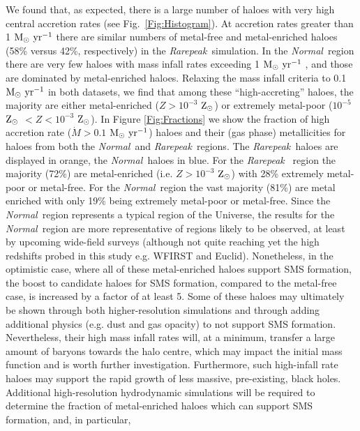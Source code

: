 \documentclass[graphics, twocolumn, usenatbib]{mn2e}
\newcommand{\msolaryr} {$\rm{M_{\odot}~yr^{-1}}~$}
\newcommand{\msolaryrc} {$\rm{M_{\odot}~yr^{-1}}$}
\newcommand{\zsolar} {$\rm{Z_{\odot}}~$}
\newcommand{\zsolarc} {$\rm{Z_{\odot}}$}
\newcommand{\rarepeak} {\textit{Rarepeak~}}
\newcommand{\normal} {\textit{Normal~}}
\begin{document}
\indent We found that, as expected, there is a large number of haloes with
very high central accretion rates (see Fig.~\ref{Fig:Histogram}). At accretion rates
greater than 1 \msolaryr there are similar numbers of metal-free and metal-enriched haloes
(58\% versus 42\%, respectively) in the \rarepeak simulation. In the \normal region there are very few haloes with mass
infall rates exceeding 1 \msolaryr, and those are dominated by metal-enriched haloes. Relaxing the
mass infall criteria to 0.1 \msolaryr in both datasets, we find that among these ``high-accreting''
haloes, the majority are either metal-enriched ($Z > 10^{-3}$ \zsolarc) or
extremely metal-poor ($10^{-5}$ \zsolar $ < Z < 10^{-3}$ \zsolarc). In Figure \ref{Fig:Fractions}
we show the fraction of high accretion rate ($\dot{M} > 0.1$ \msolaryrc) haloes and
their (gas phase) metallicities for haloes from both the \normal and \rarepeak regions.
The \rarepeak haloes are displayed in orange, the \normal haloes in blue. For the \rarepeak
region the majority (72\%) are metal-enriched (i.e. $Z > 10^{-3}$ \zsolarc) with 28\% extremely
metal-poor or metal-free. For the \normal region the vast
majority (81\%) are metal enriched with only 19\% being extremely metal-poor or metal-free.
Since the \normal region represents a typical
region of the Universe, the results for the \normal region are more representative of 
regions likely to be observed, at least by upcoming wide-field surveys (although not quite
reaching yet the high redshifts probed in this study e.g. WFIRST and Euclid). Nonetheless, 
in the optimistic case, where all of these metal-enriched haloes support SMS formation, the boost to
candidate haloes for SMS formation, compared to the metal-free case, is increased by a factor of
at least 5. Some of these haloes may ultimately be shown through both  higher-resolution simulations and through adding additional physics (e.g. dust and gas opacity) 
to not support SMS formation. Nevertheless, their high mass infall rates will, at a minimum, transfer
a large amount of baryons towards the halo centre, which may impact the initial mass function and
is worth further investigation. Furthermore, such high-infall rate haloes may support the rapid
growth of less massive, pre-existing, black holes. \\
\indent Additional high-resolution hydrodynamic simulations will be required to
determine the fraction of metal-enriched haloes which can support SMS formation, and, in particular,
\end{document}
